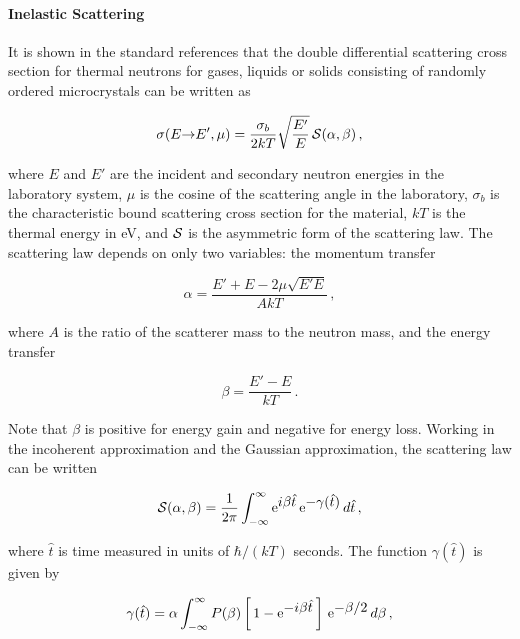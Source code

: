 \paragraph{Inelastic Scattering}
It is shown in the standard references\cite{Parks} that the double
differential scattering cross section for thermal neutrons for gases,
liquids or solids consisting of randomly ordered microcrystals can be
written as

\begin{equation}
   \sigma(E{\rightarrow}E',\mu)=\frac{\sigma_b}{2kT}
      \sqrt{\frac{E'}{E}}\,{\cal S}(\alpha,\beta)\,,
\end{equation}

\noindent
where $E$ and $E'$ are the incident and secondary neutron energies in the
laboratory system, $\mu$ is the cosine of the scattering angle in the
laboratory, $\sigma_b$ is the characteristic bound scattering cross
section for the material, $kT$ is the thermal energy in eV, and ${\cal S}$
is the asymmetric form of the scattering law.  The  scattering law depends
on only two variables: the momentum transfer

\begin{equation}
   \alpha=\frac{E'+E-2\mu\sqrt{E'E}}{AkT}\,,
\label{alph}
\end{equation}

\noindent
where $A$ is the ratio of the scatterer mass to the neutron mass, and
the energy transfer

\begin{equation}
   \beta=\frac{E'-E}{kT}\,.
\end{equation}

\noindent
Note that $\beta$ is positive for energy gain and negative for energy
loss.  Working in the incoherent approximation and the Gaussian approximation,
the scattering law can be written

\begin{equation}
   {\cal S}(\alpha,\beta)=\frac{1}{2\pi}\int_{-\infty}^\infty{\rm e}^{\textstyle i\beta\hat{t}}
      \,{\rm e}^{\textstyle -\gamma(\hat{t})}\,d\hat{t}\,,
   \label{sincoh}
\end{equation}

\noindent
where $\hat{t}$ is time measured in units of $\hbar/(kT)$ seconds.
The function $\gamma(\hat{t})$ is given by

\begin{equation}
   \gamma(\hat{t})=\alpha\int_{-\infty}^\infty P(\beta)
      \left[\,1-{\rm e}^{\textstyle -i\beta\hat{t}}\,\right]\,{\rm e}^{\textstyle -\beta/2}\,d\beta\,,
   \label{gamma}
\end{equation}

